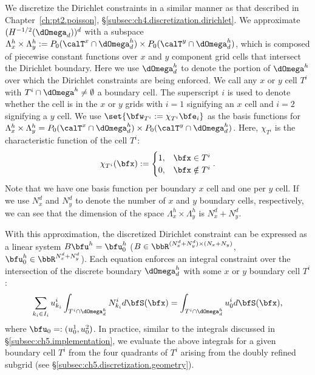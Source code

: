 We discretize the Dirichlet constraints in a similar manner as that described in Chapter~\ref{ch:pt2.poisson}, \S\ref{subsec:ch4.discretization.dirichlet}. We approximate $(H^{-1/2}(\dOmega_d))^d$ with a subspace $\Lambda_x^h \times \Lambda_y^h := P_0(\calT^{x} \cap \dOmega_d^h) \times P_0(\calT^y \cap \dOmega_d^h)$, which is composed of piecewise constant functions over $x$ and $y$ component grid cells that intersect the Dirichlet boundary. Here we use $\dOmega_d^h$ to denote the portion of $\dOmega^h$ over which the Dirichlet constraints are being enforced. We call any $x$ or $y$ cell $T^i$ with $T^i \cap \dOmega^h \neq \emptyset$ a boundary cell. The superscript $i$ is used to denote whether the cell is in the $x$ or $y$ grids with $i = 1$ signifying an $x$ cell and $i = 2$ signifying a $y$ cell. We use $\set{\bfw_{T^i} := \chi_{T^i} \bfe_i}$ as the basis functions for $\Lambda_x^h \times \Lambda_y^h = P_0(\calT^x \cap \dOmega_d^h) \times P_0(\calT^y \cap \dOmega_d^h)$. Here, $\chi_{T^i}$ is the characteristic function of the cell $T^i$:
\begin{equation*}
\chi_{T^i}(\bfx) := \begin{cases} 1, & \bfx \in T^i \\ 0, & \bfx \notin T^i \end{cases}.
\end{equation*}
Note that we have one basis function per boundary $x$ cell and one per $y$ cell. If we use $N^d_x$ and $N^d_y$ to denote the number of $x$ and $y$ boundary cells, respectively, we can see that the dimension of the space $\Lambda_x^h \times \Lambda_y^h$ is $N^d_x + N^d_y$.

With this approximation, the discretized Dirichlet constraint can be expressed as a linear system $B \bfu^h = \bfu_0^h$ ($B \in \bbR^{(N^d_x + N^d_y) \times (N_x + N_y)}$, $\bfu_0^h \in \bbR^{N^d_x+N^d_y}$). Each equation enforces an integral constraint over the intersection of the discrete boundary $\dOmega_d^h$ with some $x$ or $y$ boundary cell $T^i$:
\begin{equation} \label{eq:ch5.dirichlet.constraint.discrete}
\sum_{k_i \in I_i} u^i_{k_i} \int_{T^i \cap \dOmega_d^h} N^i_{k_i} d\bfS(\bfx) = \int_{T^i \cap \dOmega_d^h} u^i_0 d\bfS(\bfx),
\end{equation}
where $\bfu_0 =: (u^1_0,u^2_0)$. In practice, similar to the integrals discussed in \S\ref{subsec:ch5.implementation}, we evaluate the above integrals for a given boundary cell $T^i$ from the four quadrants of $T^i$ arising from the doubly refined subgrid (see \S\ref{subsec:ch5.discretization.geometry}).

